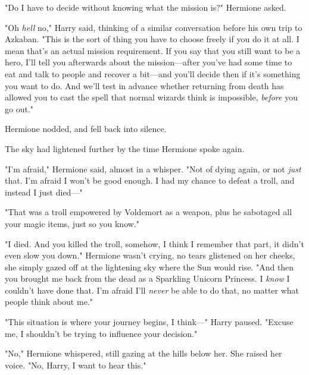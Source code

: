 "Do I have to decide without knowing what the mission is?" Hermione asked.

"Oh \emph{hell} no," Harry said, thinking of a similar conversation before his
own trip to Azkaban. "This is the sort of thing you have to choose freely if
you do it at all. I mean that's an actual mission requirement. If you say that
you still want to be a hero, I'll tell you afterwards about the mission—after
you've had some time to eat and talk to people and recover a bit—and you'll
decide then if it's something you want to do. And we'll test in advance whether
returning from death has allowed you to cast the spell that normal wizards
think is impossible, \emph{before} you go out."

Hermione nodded, and fell back into silence.

The sky had lightened further by the time Hermione spoke again.

"I'm afraid," Hermione said, almost in a whisper. "Not of dying again, or not
\emph{just} that. I'm afraid I won't be good enough. I had my chance to defeat
a troll, and instead I just died—"

"That was a troll empowered by Voldemort as a weapon, plus he sabotaged all
your magic items, just so you know."

"I died. And you killed the troll, somehow, I think I remember that part, it
didn't even slow you down." Hermione wasn't crying, no tears glistened on her
cheeks, she simply gazed off at the lightening sky where the Sun would rise.
"And then you brought me back from the dead as a Sparkling Unicorn Princess. I
\emph{know} I couldn't have done that. I'm afraid I'll \emph{never} be able to
do that, no matter what people think about me."

"This situation is where your journey begins, I think—" Harry paused. "Excuse
me, I shouldn't be trying to influence your decision."

"No," Hermione whispered, still gazing at the hills below her. She raised her
voice. "No, Harry, I want to hear this."

